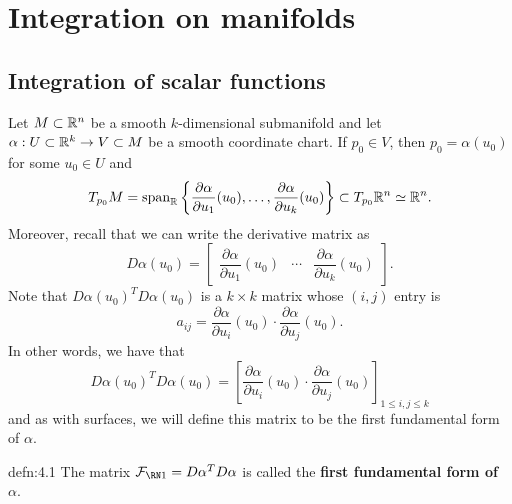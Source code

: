 \section{Integration on manifolds}\label{sec:4}

\subsection{Integration of scalar functions} \label{subsec:4.1}
Let $M \subset \mathbb{R}^n$ be a smooth $k$-dimensional submanifold and let 
$\alpha : U \subset \mathbb{R}^k \to V \subset M$ be a smooth coordinate chart. 
If $p_0 \in V$, then $p_0 = \alpha(u_0)$ for some $u_0 \in U$ and 
\[ T_{p_0}M = \operatorname{span}_{\mathbb{R}}\left\{ \frac{\partial\alpha}{\partial u_1}(u_0), 
\dots, \frac{\partial\alpha}{\partial u_k}(u_0) \right\} \subset T_{p_0}\mathbb{R}^n \simeq \mathbb{R}^n. \] 
Moreover, recall that we can write the derivative matrix as 
\[ D\alpha(u_0) = \left[ \begin{array}{c|c|c} 
    \!\!\!\dfrac{\partial\alpha}{\partial u_1}(u_0) & \cdots & 
    \dfrac{\partial\alpha}{\partial u_k}(u_0)\!\!\!
\end{array} \right]. \]
Note that $D\alpha(u_0)^T D\alpha(u_0)$ is a $k \times k$ matrix whose 
$(i, j)$ entry is 
\[ a_{ij} = \frac{\partial\alpha}{\partial u_i}(u_0) \cdot 
\frac{\partial\alpha}{\partial u_j}(u_0). \] 
In other words, we have that 
\[ D\alpha(u_0)^T D\alpha(u_0) = \left[ \frac{\partial\alpha}{\partial u_i}(u_0) \cdot 
\frac{\partial\alpha}{\partial u_j}(u_0) \right]_{1\leq i,j\leq k} \] 
and as with surfaces, we will define this matrix to be the first fundamental 
form of $\alpha$. 

\begin{defn}{defn:4.1}
    The matrix $\FFF = D\alpha^T D\alpha$ is called the {\bf first fundamental 
    form of $\alpha$}.
\end{defn}\vspace{-0.25cm}

